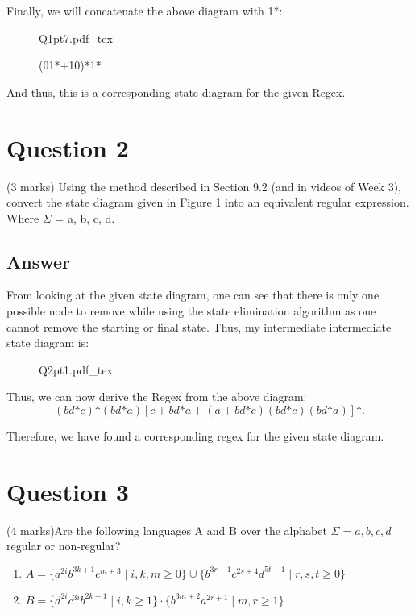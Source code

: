 \documentclass[12pt]{book}
\newcommand{\incfig}[1]{%
    {#1.pdf_tex}
}
\begin{document}
Finally, we will concatenate the above diagram with 1*:
\begin{figure}[h]
        \centering
        \incfig{Q1pt7}
        \caption{(01*+10)*1*}
\end{figure}

And thus, this is a corresponding state diagram for the given Regex.

\section*{Question 2}
(3 marks) Using the method described in Section 9.2 (and in videos of Week 3), convert
the state diagram given in Figure 1 into an equivalent regular expression. Where $\Sigma$ =
{a, b, c, d}.

\subsection*{Answer}
{\small
From looking at the given state diagram, one can see that there is only one possible node to remove
        while using the state elimination algorithm as one cannot remove the starting or final state.
Thus, my intermediate intermediate state diagram is:}
\begin{figure}[h]
        \centering
        \incfig{Q2pt1}
\end{figure}

Thus, we can now derive the Regex from the above diagram:
\[
        (bd\text{*}c)\text{*}(bd\text{*}a)
        [c+bd\text{*}a+(a+bd\text{*}c)(bd\text{*}c)(bd\text{*}a)]\text{*}
.\] 

Therefore, we have found a corresponding regex for the given state diagram.

\section*{Question 3}
(4 marks)Are the following languages A and B over the alphabet $\Sigma = {a, b, c, d}$ regular or non-regular?
\begin{enumerate}[label=\alph*)]
        \item $A = \{a^{2i} b^{3k+1} c^{m+3} \mid i,k,m \geq 0\}\cup\{b^{3r+1} c^{2s+4} d^{5t+1} \mid r,s,t \geq 0\}$
        \item $B = \{d^{2i} c^{3i} b^{2k+1} \mid i,k\geq 1\}\cdot\{b^{3m+2} a^{2r+1} \mid m,r\geq 1\}$
\end{enumerate}
\end{document}
